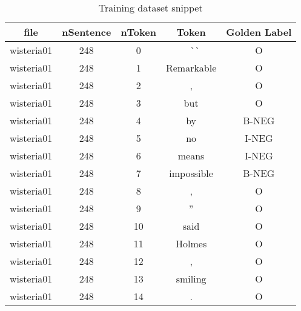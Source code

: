 \begin{table}[!h]
\centering
\caption{\label{tab:trainingdf}Training dataset snippet}
\begin{tabular}{ccccc}
\hline
file       & nSentence & nToken & Token        & Golden Label  \\ 
\hline
wisteria01 & 248       & 0   & ~ ~\`{}\`{}~ & O             \\
wisteria01 & 248       & 1      & Remarkable   & O             \\
wisteria01 & 248       & 2      & ,            & O             \\
wisteria01 & 248       & 3      & but          & O             \\
wisteria01 & 248       & 4      & by           & B-NEG         \\
wisteria01 & 248       & 5      & no           & I-NEG         \\
wisteria01 & 248       & 6      & means        & I-NEG         \\
wisteria01 & 248       & 7      & impossible   & B-NEG         \\
wisteria01 & 248       & 8      & ,            & O             \\
wisteria01 & 248       & 9      & ''           & O             \\
wisteria01 & 248       & 10     & said         & O             \\
wisteria01 & 248       & 11     & Holmes       & O             \\
wisteria01 & 248       & 12     & ,            & O             \\
wisteria01 & 248       & 13     & smiling      & O             \\
wisteria01 & 248       & 14     & .            & O             \\
\hline
\end{tabular}
\end{table}

